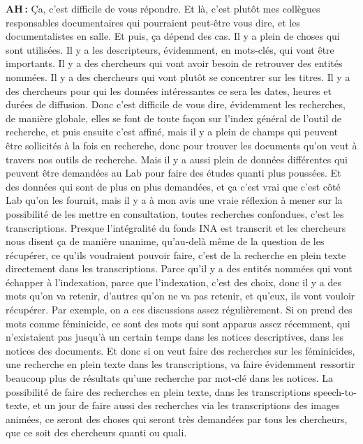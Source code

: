 \textbf{AH :} Ça, c'est difficile de vous répondre. Et là, c'est plutôt mes collègues responsables documentaires qui pourraient peut-être vous dire, et les documentalistes en salle. Et puis, ça dépend des cas.  Il y a plein de choses qui sont utilisées.  Il y a les descripteurs, évidemment, en mots-clés, qui vont être importants.  Il y a des chercheurs qui vont avoir besoin de retrouver des entités nommées. Il y a des chercheurs qui vont plutôt se concentrer sur les titres.  Il y a des chercheurs pour qui les données intéressantes  ce sera les dates, heures et durées de diffusion. Donc c'est difficile de vous dire, évidemment les recherches, de manière globale, elles se font de toute façon sur l'index général de l'outil de recherche, et puis ensuite c'est affiné, mais il y a plein de champs qui peuvent être sollicités à la fois en recherche, donc pour trouver les documents qu'on veut à travers nos outils de recherche. Mais il y a aussi plein de données différentes qui peuvent être demandées au Lab pour faire des études quanti plus poussées.  Et des données qui sont de plus en plus demandées, et ça c'est vrai que c'est côté Lab qu'on les fournit, mais il y a à mon avis une vraie réflexion à mener sur la possibilité de les mettre en consultation, toutes recherches confondues, c'est les transcriptions. Presque l'intégralité du fonds INA est transcrit et les chercheurs nous disent ça de manière unanime, qu'au-delà même de la question de les récupérer, ce qu'ils voudraient pouvoir faire, c'est de la recherche en plein texte directement dans les transcriptions.  Parce qu'il y a des entités nommées qui vont échapper à l'indexation, parce que l'indexation, c'est des choix, donc il y a des mots qu'on va retenir, d'autres qu'on ne va pas retenir, et qu'eux, ils vont vouloir récupérer. Par exemple, on a ces discussions assez régulièrement. Si on prend des mots comme féminicide, ce sont des mots qui sont apparus assez récemment, qui n'existaient pas jusqu'à un certain temps dans les notices descriptives, dans les notices des documents.  Et donc si on veut faire des recherches sur les féminicides, une recherche en plein texte dans les transcriptions, va faire évidemment ressortir beaucoup plus de résultats qu’une recherche par mot-clé dans les notices. La possibilité de faire des recherches en plein texte, dans les transcriptions speech-to-texte, et un jour de faire aussi des recherches via les transcriptions des images animées, ce seront des choses qui seront très demandées par tous les chercheurs, que ce soit des chercheurs quanti ou quali.

